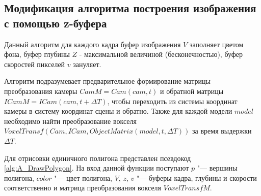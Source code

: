 \subsection{Модификация алгоритма построения изображения с помощью z-буфера}


Данный алгоритм для каждого кадра буфер изображения $V$ заполняет цветом фона, буфер глубины $Z$ - максимальной величиной (бесконечностью), буфер скоростей пикселей $v$ зануляет. 

Алгоритм подразумевает предварительное формирование матрицы преобразования камеры $CamM = Cam(cam, t)$ и обратной матрицы $ICamM = ICam(cam, t + \Delta T)$, чтобы переходить из системы координат камеры в систему координат сцены и обратно. Также для каждой модели $model$ необходимо найти преобразование вокселя $VoxelTransf(Cam, ICam, ObjectMatrix(model, t, \Delta T))$ за время выдержки $\Delta T$.  

Для отрисовки единичного полигона представлен псевдокод \ref{alg:A_DrawPolygon}.  На вход данной функции поступают $p$ "--- вершины полигона, $color$ "--- цвет полигона, $V$, $z$, $v$ "--- буферы кадра, глубины и скорости соответственно и матрица преобразования вокселя $VoxelTransfM$.


